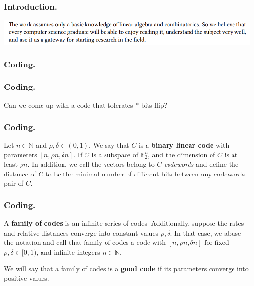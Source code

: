 \documentclass[usenames, aspectratio=169]{beamer}
\begin{document}
\begin{frame}
  \frametitle{Introduction.}
  \includegraphics[width=.7\linewidth]{./Assumption-out.png}
\end{frame}



\begin{frame}
  \frametitle{ Coding. }
  \begin{center}
\end{center}
\end{frame}

\begin{frame}
  \frametitle{ Coding. }
  Can we come up with a code that tolerates $*$ bits flip? 
\end{frame} 

\begin{frame}
  \frametitle{ Coding. }
\begin{definition} 
  Let $n \in \mathbb{N}$ and $\rho, \delta\in \left( 0,1 \right)$. We say that $C$ is a \textbf{binary linear code} with parameters $[n, \rho n, \delta n]$. If $C$ is a subspace of $\mathbb{F}_{2}^{n}$, and the dimension of $C$ is at least $\rho n$. In addition, we call the vectors belong to $C$ \textit{codewords} and define the distance of $C$ to be the minimal number of different bits between any codewords pair of $C$.   
  \end{definition}
\end{frame} 

\begin{frame}
  \frametitle{ Coding. }
\begin{definition} 
  A \textbf{family of codes} is an infinite series of codes. Additionally, suppose the rates and relative distances converge into constant values $\rho,\delta$. In that case, we abuse the notation and call that family of codes a code with $[n, \rho n, \delta n]$ for fixed $\rho, \delta\in [ 0,1 )$, and infinite integers $n \in \mathbb{N}$.     
  \end{definition}
\begin{definition} 
  We will say that a family of codes is a \textbf{good code} if its parameters converge into positive values. 
  \end{definition}
\end{frame} 
\end{document}
